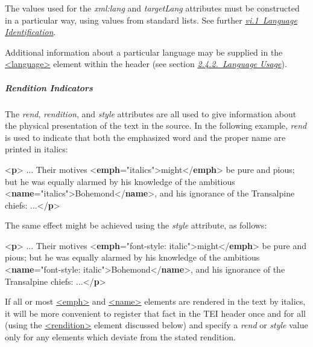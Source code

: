 The values used for the {\itshape xml:lang} and {\itshape targetLang} attributes must be constructed in a particular way, using values from standard lists. See further \textit{\hyperref[CHSH]{vi.1\ Language Identification}}.\par
Additional information about a particular language may be supplied in the \hyperref[TEI.language]{<language>} element within the header (see section \textit{\hyperref[HD41]{2.4.2.\ Language Usage}}).
\subparagraph[{Rendition Indicators}]{Rendition Indicators}\label{STGAre}\par
The {\itshape rend}, {\itshape rendition}, and {\itshape style} attributes are all used to give information about the physical presentation of the text in the source. In the following example, {\itshape rend} is used to indicate that both the emphasized word and the proper name are printed in italics: \par\bgroup{}\exampleFont \begin{shaded}\noindent\mbox{}{<\textbf{p}>} ... Their motives {<\textbf{emph}\hspace*{1em}{rend}="{italics}">}might{</\textbf{emph}>} be pure\mbox{}\newline 
 and pious; but he was equally alarmed by his knowledge of the ambitious {<\textbf{name}\hspace*{1em}{rend}="{italics}">}Bohemond{</\textbf{name}>}, and his ignorance of the Transalpine chiefs:\mbox{}\newline 
 ...{</\textbf{p}>}\end{shaded}\egroup\par \noindent  The same effect might be achieved using the {\itshape style} attribute, as follows: \par\bgroup{}\exampleFont \begin{shaded}\noindent\mbox{}{<\textbf{p}>} ... Their motives {<\textbf{emph}\hspace*{1em}{style}="{font-style: italic}">}might{</\textbf{emph}>} be pure and pious; but he was equally alarmed by his knowledge of\mbox{}\newline 
 the ambitious {<\textbf{name}\hspace*{1em}{style}="{font-style: italic}">}Bohemond{</\textbf{name}>}, and his ignorance of\mbox{}\newline 
 the Transalpine chiefs: ...{</\textbf{p}>}\end{shaded}\egroup\par \noindent  If all or most \hyperref[TEI.emph]{<emph>} and \hyperref[TEI.name]{<name>} elements are rendered in the text by italics, it will be more convenient to register that fact in the TEI header once and for all (using the \hyperref[TEI.rendition]{<rendition>} element discussed below) and specify a {\itshape rend} or {\itshape style} value only for any elements which deviate from the stated rendition.\par
